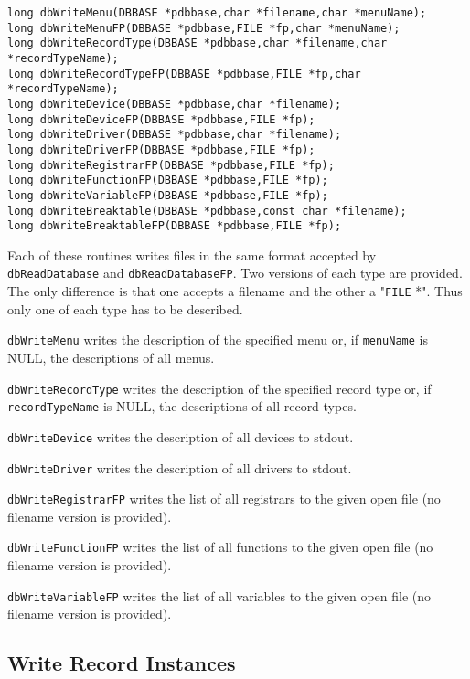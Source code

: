 \begin{verbatim}long dbWriteMenu(DBBASE *pdbbase,char *filename,char *menuName);
long dbWriteMenuFP(DBBASE *pdbbase,FILE *fp,char *menuName);
long dbWriteRecordType(DBBASE *pdbbase,char *filename,char *recordTypeName);
long dbWriteRecordTypeFP(DBBASE *pdbbase,FILE *fp,char *recordTypeName);
long dbWriteDevice(DBBASE *pdbbase,char *filename);
long dbWriteDeviceFP(DBBASE *pdbbase,FILE *fp);
long dbWriteDriver(DBBASE *pdbbase,char *filename);
long dbWriteDriverFP(DBBASE *pdbbase,FILE *fp);
long dbWriteRegistrarFP(DBBASE *pdbbase,FILE *fp);
long dbWriteFunctionFP(DBBASE *pdbbase,FILE *fp);
long dbWriteVariableFP(DBBASE *pdbbase,FILE *fp);
long dbWriteBreaktable(DBBASE *pdbbase,const char *filename);
long dbWriteBreaktableFP(DBBASE *pdbbase,FILE *fp);
\end{verbatim}
Each of these routines writes files in the same format accepted by \verb|dbReadDatabase| and \verb|dbReadDatabaseFP|. Two 
versions of each type are provided. The only difference is that one accepts a filename and the other a "\verb|FILE| *". Thus only 
one of each type has to be described.

\verb|dbWriteMenu| writes the description of the specified menu or, if \verb|menuName| is NULL, the descriptions of all menus.

\verb|dbWriteRecordType| writes the description of the specified record type or, if \verb|recordTypeName| is NULL, the 
descriptions of all record types.

\verb|dbWriteDevice| writes the description of all devices to stdout.

\verb|dbWriteDriver| writes the description of all drivers to stdout.

\verb|dbWriteRegistrarFP| writes the list of all registrars to the given open file (no filename version is provided).

\verb|dbWriteFunctionFP| writes the list of all functions to the given open file (no filename version is provided).

\verb|dbWriteVariableFP| writes the list of all variables to the given open file (no filename version is provided).

\subsection{Write Record Instances}

